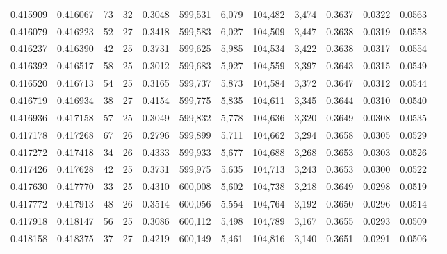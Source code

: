 \begin{tabular}{rrrrrrrrrrrrr}
0.415909 & 0.416067 &    73 &  32 &                                     0.3048 & 599,531 &   6,079 & 104,482 &   3,474 & 0.3637 & 0.0322 & 0.0563 \\
0.416079 & 0.416223 &    52 &  27 &                                     0.3418 & 599,583 &   6,027 & 104,509 &   3,447 & 0.3638 & 0.0319 & 0.0558 \\
0.416237 & 0.416390 &    42 &  25 &                                     0.3731 & 599,625 &   5,985 & 104,534 &   3,422 & 0.3638 & 0.0317 & 0.0554 \\
0.416392 & 0.416517 &    58 &  25 &                                     0.3012 & 599,683 &   5,927 & 104,559 &   3,397 & 0.3643 & 0.0315 & 0.0549 \\
0.416520 & 0.416713 &    54 &  25 &                                     0.3165 & 599,737 &   5,873 & 104,584 &   3,372 & 0.3647 & 0.0312 & 0.0544 \\
0.416719 & 0.416934 &    38 &  27 &                                     0.4154 & 599,775 &   5,835 & 104,611 &   3,345 & 0.3644 & 0.0310 & 0.0540 \\
0.416936 & 0.417158 &    57 &  25 &                                     0.3049 & 599,832 &   5,778 & 104,636 &   3,320 & 0.3649 & 0.0308 & 0.0535 \\
0.417178 & 0.417268 &    67 &  26 &                                     0.2796 & 599,899 &   5,711 & 104,662 &   3,294 & 0.3658 & 0.0305 & 0.0529 \\
0.417272 & 0.417418 &    34 &  26 &                                     0.4333 & 599,933 &   5,677 & 104,688 &   3,268 & 0.3653 & 0.0303 & 0.0526 \\
0.417426 & 0.417628 &    42 &  25 &                                     0.3731 & 599,975 &   5,635 & 104,713 &   3,243 & 0.3653 & 0.0300 & 0.0522 \\
0.417630 & 0.417770 &    33 &  25 &                                     0.4310 & 600,008 &   5,602 & 104,738 &   3,218 & 0.3649 & 0.0298 & 0.0519 \\
0.417772 & 0.417913 &    48 &  26 &                                     0.3514 & 600,056 &   5,554 & 104,764 &   3,192 & 0.3650 & 0.0296 & 0.0514 \\
0.417918 & 0.418147 &    56 &  25 &                                     0.3086 & 600,112 &   5,498 & 104,789 &   3,167 & 0.3655 & 0.0293 & 0.0509 \\
0.418158 & 0.418375 &    37 &  27 &                                     0.4219 & 600,149 &   5,461 & 104,816 &   3,140 & 0.3651 & 0.0291 & 0.0506 \\

\end{tabular}
